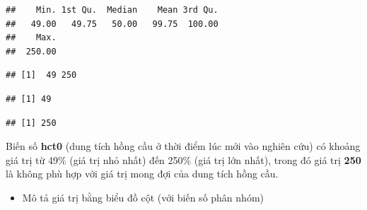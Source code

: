 \documentclass[]{tufte-book}
\newenvironment{Shaded}{}{}
\newcommand{\KeywordTok}[1]{\textcolor[rgb]{0.00,0.44,0.13}{\textbf{#1}}}
\newcommand{\NormalTok}[1]{#1}
\newcommand{\OperatorTok}[1]{\textcolor[rgb]{0.40,0.40,0.40}{#1}}
\providecommand{\tightlist}{%
  \setlength{\itemsep}{0pt}\setlength{\parskip}{0pt}}
\begin{document}
\begin{verbatim}
##    Min. 1st Qu.  Median    Mean 3rd Qu. 
##   49.00   49.75   50.00   99.75  100.00 
##    Max. 
##  250.00
\end{verbatim}

\begin{Shaded}
\end{Shaded}

\begin{verbatim}
## [1]  49 250
\end{verbatim}

\begin{Shaded}
\end{Shaded}

\begin{verbatim}
## [1] 49
\end{verbatim}

\begin{Shaded}
\end{Shaded}

\begin{verbatim}
## [1] 250
\end{verbatim}

Biến số \textbf{hct0} (dung tích hồng cầu ở thời điểm lúc mới vào nghiên cứu) có khoảng giá trị từ 49\% (giá trị nhỏ nhất) đến 250\% (giá trị lớn nhất), trong đó giá trị \textbf{250} là không phù hợp với giá trị mong đợi của dung tích hồng cầu.

\begin{itemize}
\tightlist
\item
  Mô tả giá trị bằng biểu đồ cột (với biến số phân nhóm)
\end{itemize}

\begin{Shaded}
\end{Shaded}
\end{document}
